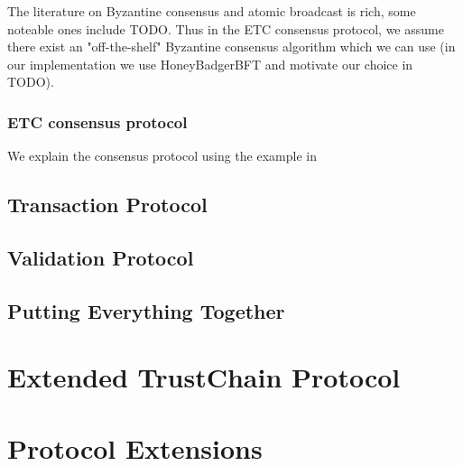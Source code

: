 The literature on Byzantine consensus and atomic broadcast is rich, some noteable ones include TODO.
Thus in the ETC consensus protocol, we assume there exist an "off-the-shelf" Byzantine consensus algorithm which we can use
(in our implementation we use HoneyBadgerBFT and motivate our choice in TODO).

\subsubsection{ETC consensus protocol} 
We explain the consensus protocol using the example in 

\subsection{Transaction Protocol}

\subsection{Validation Protocol}

\subsection{Putting Everything Together}

\section{Extended TrustChain Protocol}

\section{Protocol Extensions}